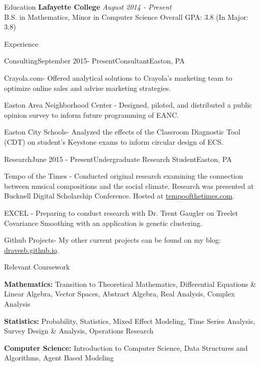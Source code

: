 \documentclass{resume} %
\begin{document}
\begin{rSection}{Education}
{\bf Lafayette College} \hfill {\em August 2014 - Present} \\ 
B.S. in Mathematics, Minor in Computer Science \hfill Overall GPA: 3.8 (In Major: 3.8)
\end{rSection}

\begin{rSection}{Experience}

\begin{rSubsection}{Consulting}{September 2015- Present}{Consultant}{Easton, PA} 
\item Crayola.com- Offered analytical solutions to Crayola's marketing team to optimize online sales and advise marketing strategies. 
\item Easton Area Neighborhood Center - Designed, piloted, and distributed a public opinion survey to inform future programming of EANC. 
\item Easton City Schools- Analyzed the effects of the Classroom Diagnostic Tool (CDT) on student's Keystone exams to inform circular design of ECS. 
\end{rSubsection}

\begin{rSubsection}{Research}{June 2015 - Present}{Undergraduate Research Student}{Easton, PA}
\item Tempo of the Times - Conducted original research examining the connection between musical compositions and the social climate. Research was presented at Bucknell Digital Scholarship Conference. Hosted at \url{tempoofthetimes.com}.  
\item EXCEL - Preparing to conduct research with Dr. Trent Gaugler on Treelet Covariance Smoothing with an application is genetic clustering.
\item Github Projects- My other current projects can be found on my blog: \url{dravesb.github.io}. 
\end{rSubsection}

\end{rSection}
\begin{rSection}{Relevant Coursework}
\item \textbf{Mathematics:} Transition to Theoretical Mathematics, Differential Equations \& Linear Algebra, Vector Spaces, Abstract Algebra, Real Analysis, Complex Analysis

\item \textbf{Statistics:} Probability, Statistics, Mixed Effect Modeling, Time Series Analysis, Survey Design \& Analysis, Operations Research


\item \textbf{Computer Science:} Introduction to Computer Science, Data Structures and Algorithms, Agent Based Modeling

\end{rSection}
\end{document}
